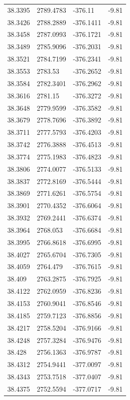 \begin{table}[H]
\begin{tabular}{llll}
38.3395 & 2789.4783 & -376.11 & -9.81 \\
38.3426 & 2788.2889 & -376.1411 & -9.81 \\
38.3458 & 2787.0993 & -376.1721 & -9.81 \\
38.3489 & 2785.9096 & -376.2031 & -9.81 \\
38.3521 & 2784.7199 & -376.2341 & -9.81 \\
38.3553 & 2783.53 & -376.2652 & -9.81 \\
38.3584 & 2782.3401 & -376.2962 & -9.81 \\
38.3616 & 2781.15 & -376.3272 & -9.81 \\
38.3648 & 2779.9599 & -376.3582 & -9.81 \\
38.3679 & 2778.7696 & -376.3892 & -9.81 \\
38.3711 & 2777.5793 & -376.4203 & -9.81 \\
38.3742 & 2776.3888 & -376.4513 & -9.81 \\
38.3774 & 2775.1983 & -376.4823 & -9.81 \\
38.3806 & 2774.0077 & -376.5133 & -9.81 \\
38.3837 & 2772.8169 & -376.5444 & -9.81 \\
38.3869 & 2771.6261 & -376.5754 & -9.81 \\
38.3901 & 2770.4352 & -376.6064 & -9.81 \\
38.3932 & 2769.2441 & -376.6374 & -9.81 \\
38.3964 & 2768.053 & -376.6684 & -9.81 \\
38.3995 & 2766.8618 & -376.6995 & -9.81 \\
38.4027 & 2765.6704 & -376.7305 & -9.81 \\
38.4059 & 2764.479 & -376.7615 & -9.81 \\
38.409 & 2763.2875 & -376.7925 & -9.81 \\
38.4122 & 2762.0959 & -376.8236 & -9.81 \\
38.4153 & 2760.9041 & -376.8546 & -9.81 \\
38.4185 & 2759.7123 & -376.8856 & -9.81 \\
38.4217 & 2758.5204 & -376.9166 & -9.81 \\
38.4248 & 2757.3284 & -376.9476 & -9.81 \\
38.428 & 2756.1363 & -376.9787 & -9.81 \\
38.4312 & 2754.9441 & -377.0097 & -9.81 \\
38.4343 & 2753.7518 & -377.0407 & -9.81 \\
38.4375 & 2752.5594 & -377.0717 & -9.81 \\

\end{tabular}
\end{table}
